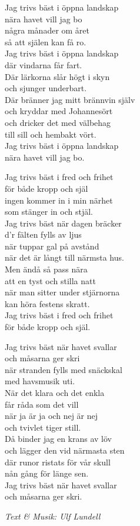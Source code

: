 \vspace{10pt}
Jag trivs bäst i öppna landskap\\
nära havet vill jag bo\\
några månader om året\\
så att själen kan få ro.\\
Jag trivs bäst i öppna landskap\\
där vindarna får fart.\\
Där lärkorna slår högt i skyn\\
och sjunger underbart.\\
Där bränner jag mitt brännvin själv\\
och kryddar med Johannesört\\
och dricker det med välbehag\\
till sill och hembakt vört.\\
Jag trivs bäst i öppna landskap\\
nära havet vill jag bo.\par
\vspace{10pt}
Jag trivs bäst i fred och frihet\\
för både kropp och själ\\
ingen kommer in i min närhet\\
som stänger in och stjäl.\\
Jag trivs bäst när dagen bräcker\\
d'r fälten fylls av ljus\\
när tuppar gal på avstånd\\
när det är långt till närmsta hus.\\
Men ändå så pass nära\\
att en tyst och stilla natt\\
när man sitter under stjärnorna\\
kan höra festens skratt.\\
Jag trivs bäst i fred och frihet\\
för både kropp och själ.\par
\newpage
Jag trivs bäst när havet svallar\\
och måsarna ger skri\\
när stranden fylls med snäckskal\\
med havsmusik uti.\\
När det klara och det enkla\\
får råda som det vill\\
när ja är ja och nej är nej\\
och tvivlet tiger still.\\
Då binder jag en krans av löv\\
och lägger den vid närmasta sten\\
där runor ristats för vår skull\\
nån gång för länge sen.\\
Jag trivs bäst när havet svallar\\
och måsarna ger skri.\par
\vspace{10pt}
{\footnotesize\textit{Text \& Musik: Ulf Lundell}}
